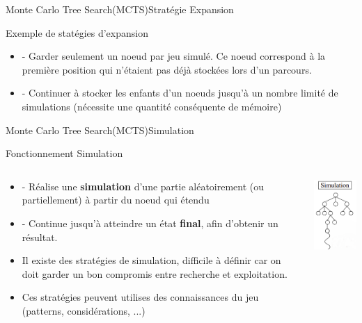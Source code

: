 \begin{frame}{Monte Carlo Tree Search(MCTS)}{Stratégie Expansion}
	\begin{block}{Exemple de statégies d'expansion}
			\begin{itemize}
				\item - Garder seulement un noeud par jeu simulé. Ce noeud correspond à la première position qui n'étaient pas déjà stockées lors d'un parcours.
				\item - Continuer à stocker les enfants d'un noeuds jusqu'à un nombre limité de simulations (nécessite une quantité conséquente de mémoire)
			\end{itemize}
	\end{block}
\end{frame}

\begin{frame}{Monte Carlo Tree Search(MCTS)}{Simulation}
	\begin{block}{Fonctionnement Simulation}
		\begin{columns}
			\begin{column}{7cm}
				\begin{itemize}
					\item - Réalise une \textbf{simulation} d'une partie aléatoirement (ou partiellement) à partir du noeud qui étendu
					\item - Continue jusqu'à atteindre un état \textbf{final}, afin d'obtenir un résultat.
					\item Il existe des stratégies de simulation, difficile à définir car on doit garder un bon compromis entre recherche et exploitation.
					\item Ces stratégies peuvent utilises des connaissances du jeu (patterns, considérations, ...)
				\end{itemize}
			\end{column}
			\begin{column}{4cm}
				\includegraphics[width=3cm]{ressources/Simulation.png}
			\end{column}
		\end{columns}
	\end{block}
\end{frame}

